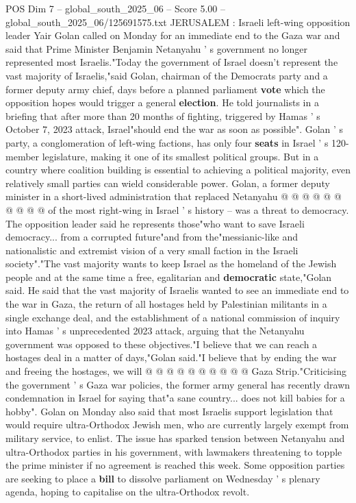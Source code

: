 \begin{textsample}{POS Dim 7 – global\_south\_2025\_06 – Score 5.00 – global\_south\_2025\_06/125691575.txt}  \label{ex:f7_pos_398}
JERUSALEM : Israeli left-wing opposition leader Yair Golan called on Monday for an immediate end to the Gaza war and said that Prime Minister Benjamin Netanyahu ' s government no longer represented most Israelis."Today the government of Israel doesn't represent the vast majority of Israelis,"said Golan, chairman of the Democrats party and a former deputy army chief, days before a planned parliament \textbf{vote} which the opposition hopes would trigger a general \textbf{election}.
He told journalists in a briefing that after more than 20 months of fighting, triggered by Hamas ' s October 7, 2023 attack, Israel"should end the war as soon as possible".
Golan ' s party, a conglomeration of left-wing factions, has only four \textbf{seats} in Israel ' s 120-member legislature, making it one of its smallest political groups.
But in a country where coalition building is essential to achieving a political majority, even relatively small parties can wield considerable power.
Golan, a former deputy minister in a short-lived administration that replaced Netanyahu @ @ @ @ @ @ @ @ @ @ of the most right-wing in Israel ' s history -- was a threat to democracy.
The opposition leader said he represents those"who want to save Israeli democracy... from a corrupted future"and from the"messianic-like and nationalistic and extremist vision of a very small faction in the Israeli society"."The vast majority wants to keep Israel as the homeland of the Jewish people and at the same time a free, egalitarian and \textbf{democratic} state,"Golan said.
He said that the vast majority of Israelis wanted to see an immediate end to the war in Gaza, the return of all hostages held by Palestinian militants in a single exchange deal, and the establishment of a national commission of inquiry into Hamas ' s unprecedented 2023 attack, arguing that the Netanyahu government was opposed to these objectives."I believe that we can reach a hostages deal in a matter of days,"Golan said."I believe that by ending the war and freeing the hostages, we will @ @ @ @ @ @ @ @ @ @ Gaza Strip."Criticising the government ' s Gaza war policies, the former army general has recently drawn condemnation in Israel for saying that"a sane country... does not kill babies for a hobby".
Golan on Monday also said that most Israelis support legislation that would require ultra-Orthodox Jewish men, who are currently largely exempt from military service, to enlist.
The issue has sparked tension between Netanyahu and ultra-Orthodox parties in his government, with lawmakers threatening to topple the prime minister if no agreement is reached this week.
Some opposition parties are seeking to place a \textbf{bill} to dissolve parliament on Wednesday ' s plenary agenda, hoping to capitalise on the ultra-Orthodox revolt.

\end{textsample}
